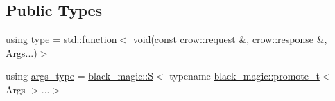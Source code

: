 \subsection*{Public Types}
\begin{DoxyCompactItemize}
\item 
using \hyperlink{structcrow_1_1detail_1_1routing__handler__call__helper_1_1_wrapped_1_1handler__type__helper_3_01176bac6491f2834cd36a05c30aa75bc3_a4254e7a313ab4c1364261c4c54d95319}{type} = std\-::function$<$ void(const \hyperlink{structcrow_1_1request}{crow\-::request} \&, \hyperlink{structcrow_1_1response}{crow\-::response} \&, Args...)$>$
\item 
using \hyperlink{structcrow_1_1detail_1_1routing__handler__call__helper_1_1_wrapped_1_1handler__type__helper_3_01176bac6491f2834cd36a05c30aa75bc3_ade60c2819ed613788645a5642e843725}{args\-\_\-type} = \hyperlink{structcrow_1_1black__magic_1_1_s}{black\-\_\-magic\-::\-S}$<$ typename \hyperlink{namespacecrow_1_1black__magic_a4964540ce915507f5167e1a96f801c71}{black\-\_\-magic\-::promote\-\_\-t}$<$ Args $>$...$>$
\end{DoxyCompactItemize}


